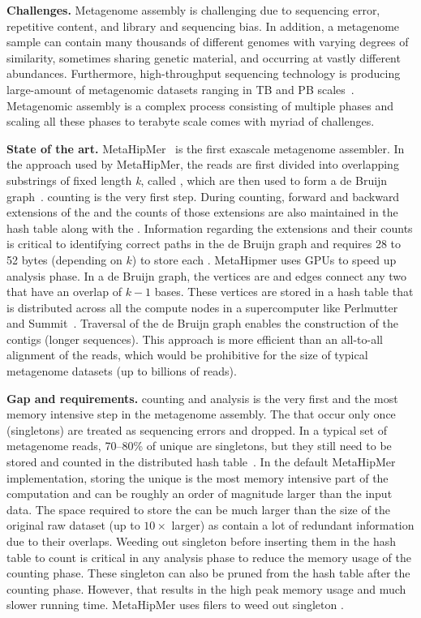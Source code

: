 \noindent
\textbf{Challenges.}
Metagenome assembly is challenging due to sequencing error, repetitive content, and library and sequencing bias. In addition, a metagenome sample can contain many thousands of different genomes with varying degrees of similarity, sometimes sharing genetic material, and occurring at vastly different abundances.
%
Furthermore, high-throughput sequencing technology is producing large-amount of metagenomic datasets ranging in TB and PB scales~\cite{hofmeyr2020terabase}. Metagenomic assembly is a complex process consisting of multiple phases and scaling all these phases to terabyte scale comes with myriad of challenges.

\noindent
\textbf{State of the art.}
MetaHipMer~\cite{GeorganasEHG18,hofmeyr2020terabase} is the first exascale metagenome assembler.
In the approach used by MetaHipMer, the reads are first divided into overlapping substrings of fixed length \emph{k}, called \emph{\kmers}, which are then used to form a de Bruijn graph~\cite{CompeauPeTe11}.
\Kmer counting is the very first step. During \kmer counting, forward and backward extensions of the \kmer and the counts of those extensions are also maintained in the hash table along with the \kmer. Information regarding the extensions and their counts is critical to identifying correct paths in the de Bruijn graph and requires 28 to 52 bytes (depending on $k$) to store each \kmer.
MetaHipmer uses GPUs to speed up \kmer analysis phase.
In a de Bruijn graph, the vertices are \kmers and edges connect any two \kmers that have an overlap of $k-1$ bases. These vertices are stored in a hash table that is distributed across all the compute nodes in a supercomputer like Perlmutter~\cite{perlmutter} and Summit~\cite{summit}.
Traversal of the de Bruijn graph enables the construction of the contigs (longer sequences).  This approach is more efficient than an all-to-all alignment of the reads, which would be prohibitive for the size of typical metagenome datasets (up to billions of reads).

\noindent
\textbf{Gap and requirements.}
\Kmer counting and analysis is the very first and the most memory intensive step in the metagenome assembly. The \kmers that occur only once (singletons) are treated as sequencing errors and dropped. In a typical set of metagenome reads, 70--80\% of unique \kmers are singletons, but they still need to be stored and counted in the distributed hash table~.
In the default MetaHipMer implementation, storing the unique \kmers is the most memory intensive part of the computation and can be roughly an order of magnitude larger than the input data.  The space required to store the \kmers can be much larger than the size of the original raw dataset (up to $10\times$ larger) as \kmers contain a lot of redundant information due to their overlaps.
Weeding out singleton \kmers before inserting them in the hash table to count is critical in any \kmer analysis phase to reduce the memory usage of the counting phase. These singleton \kmers can also be pruned from the hash table after the counting phase. However, that results in the high peak memory usage and much slower running time. MetaHipMer uses filers to weed out singleton \kmers.

